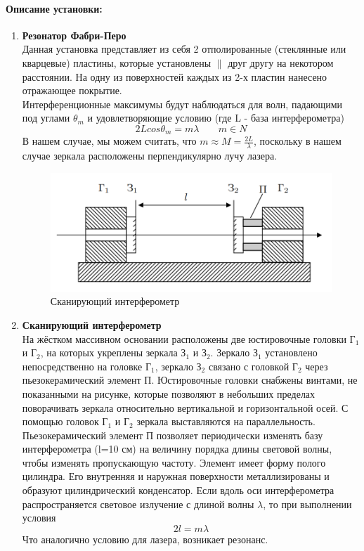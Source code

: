 \documentclass[a4paper,12pt]{article}
\begin{document}
\begin{enumerate}
\paragraph{Описание установки:}
\begin{enumerate}
\itemsep0em
\item \textbf{Резонатор Фабри-Перо}\\
Данная установка представляет из себя 2 отполированные (стеклянные или кварцевые) пластины, которые установлены $\parallel$ друг другу на некотором расстоянии. На одну из поверхностей каждых из 2-х пластин нанесено отражающее покрытие.\\
Интерференционные максимумы будут наблюдаться для волн, падающими под углами $\theta_{m}$ и удовлетворяющие условию (где L - база интерферометра)
\begin{equation}
2Lcos\theta_m = m\lambda\;\;\;\;\;\;\;m \in N
\end{equation} 
В нашем случае, мы можем считать, что $m \approx M = \frac{2L}{\lambda}$, поскольку в нашем случае зеркала расположены перпендикулярно лучу лазера.
\begin{figure}[h!]
\centering
\includegraphics[scale=0.5]{../../4_term/4_5_3/setupp.png}
\caption{Сканирующий интерферометр}
\end{figure}
\item \textbf{Сканирующий интерферометр}\\
На жёстком массивном основании расположены две юстировочные
головки Г$_1$ и Г$_2$, на которых укреплены зеркала З$_1$ и З$_2$. Зеркало З$_1$ установлено непосредственно на головке Г$_1$, зеркало З$_2$ связано с головкой Г$_2$ через пьезокерамический элемент П. Юстировочные головки снабжены винтами, не показанными на рисунке, которые позволяют в
небольших пределах поворачивать зеркала относительно вертикальной
и горизонтальной осей. С помощью головок Г$_1$ и Г$_2$ зеркала выставляются на параллельность.
Пьезокерамический элемент П позволяет периодически изменять
базу интерферометра (l=10 см) на величину порядка длины световой волны, чтобы изменять пропускающую частоту. Элемент имеет форму полого цилиндра. Его внутренняя и
наружная поверхности металлизированы и образуют цилиндрический конденсатор.
Если вдоль оси интерферометра распространяется световое излучение с длиной волны $\lambda$, то при выполнении условия 
\begin{equation}
2l = m\lambda
\end{equation}
Что аналогично условию для лазера, возникает резонанс.


\end{enumerate}
\end{enumerate}
\end{document}
